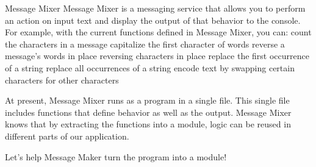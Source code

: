 Message Mixer
    Message Mixer is a messaging service that allows you to perform an action on input text and display the output of that behavior to the console. For example, with the current functions defined in Message Mixer, you can:
        count the characters in a message
        capitalize the first character of words
        reverse a message’s words in place
        reversing characters in place
        replace the first occurrence of a string
        replace all occurrences of a string
        encode text by swapping certain characters for other characters
        
    At present, Message Mixer runs as a program in a single file. This single file includes functions that define behavior as well as the output. Message Mixer knows that by extracting the functions into a module, logic can be reused in different parts of our application.

Let’s help Message Maker turn the program into a module!